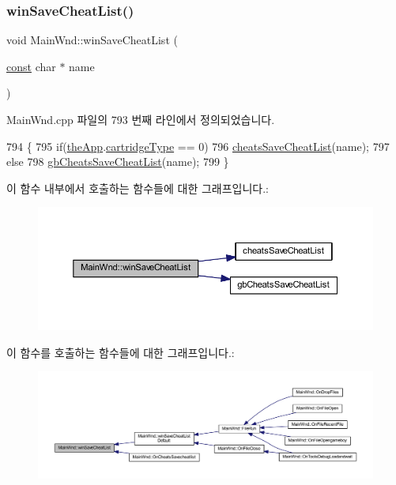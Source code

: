 \subsubsection{\texorpdfstring{win\+Save\+Cheat\+List()}{winSaveCheatList()}}
{\footnotesize\ttfamily void Main\+Wnd\+::win\+Save\+Cheat\+List (\begin{DoxyParamCaption}\item[{\mbox{\hyperlink{getopt1_8c_a2c212835823e3c54a8ab6d95c652660e}{const}} char $\ast$}]{name }\end{DoxyParamCaption})}



Main\+Wnd.\+cpp 파일의 793 번째 라인에서 정의되었습니다.


\begin{DoxyCode}
794 \{
795   \textcolor{keywordflow}{if}(\mbox{\hyperlink{_v_b_a_8cpp_a8095a9d06b37a7efe3723f3218ad8fb3}{theApp}}.\mbox{\hyperlink{class_v_b_a_af300759fcbc7eeb00ce73f956fc5ddb7}{cartridgeType}} == 0)
796     \mbox{\hyperlink{_cheats_8cpp_a516d83ca6755018dadf8d3ca0c1f24d0}{cheatsSaveCheatList}}(name);
797   \textcolor{keywordflow}{else}
798     \mbox{\hyperlink{gb_cheats_8cpp_ab5f68ce87fbfb28074c6681a50637c0e}{gbCheatsSaveCheatList}}(name);
799 \}
\end{DoxyCode}
이 함수 내부에서 호출하는 함수들에 대한 그래프입니다.\+:
\nopagebreak
\begin{figure}[H]
\begin{center}
\leavevmode
\includegraphics[width=350pt]{class_main_wnd_ab71924a5be91bd6193c6ea19ddd3d483_cgraph}
\end{center}
\end{figure}
이 함수를 호출하는 함수들에 대한 그래프입니다.\+:
\nopagebreak
\begin{figure}[H]
\begin{center}
\leavevmode
\includegraphics[width=350pt]{class_main_wnd_ab71924a5be91bd6193c6ea19ddd3d483_icgraph}
\end{center}
\end{figure}
\mbox{\label{class_main_wnd_afd3b77fc621f2b464369c472262689ab}} 
